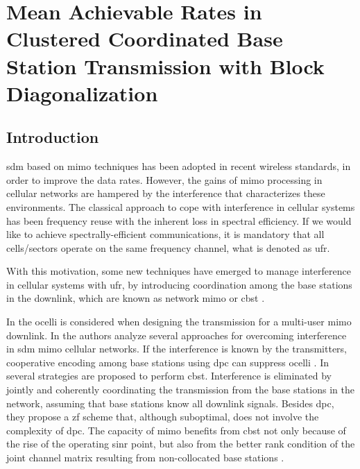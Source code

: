 \chapter[Achievable Rates]{Mean Achievable Rates in Clustered Coordinated Base Station Transmission with Block Diagonalization}

\section{Introduction}

\gls{sdm} based on \gls{mimo} techniques has been adopted in recent wireless standards, 
in order to improve the data rates. However, the gains of \gls{mimo} processing in cellular networks are hampered by the interference that characterizes these environments. The classical approach to cope with interference in cellular systems has been frequency reuse with the inherent loss in spectral efficiency. If we would like to achieve spectrally-efficient communications, it is mandatory that all cells/sectors operate on the same frequency channel, what is denoted as \gls{ufr}. 

With this motivation, some new techniques have emerged to manage interference in cellular systems with \gls{ufr}, by introducing coordination among the base stations in the downlink, which are known as network \gls{mimo} or \gls{cbst} \cite{karakayali06}.

In \cite{shim08} the \gls{ocelli} is considered when designing the transmission for a multi-user \gls{mimo} downlink. In \cite{andrews07} the authors analyze several approaches for overcoming interference in \gls{sdm} \gls{mimo} cellular networks. If the interference is known by the transmitters, cooperative encoding among base stations using \gls{dpc} can suppress \gls{ocelli} \cite{shamai01}. In \cite{karakayali06} several strategies are proposed to perform \gls{cbst}. Interference is eliminated by jointly and coherently coordinating the transmission from the base stations in the network, assuming that base stations know all downlink signals. Besides \gls{dpc}, they propose a \gls{zf} scheme that, although suboptimal, does not involve the complexity of \gls{dpc}. The capacity of \gls{mimo} benefits from \gls{cbst} not only because of the rise of the operating \gls{sinr} point, but also from the better rank condition of the joint channel matrix resulting from non-collocated base stations \cite{zhang04}.


